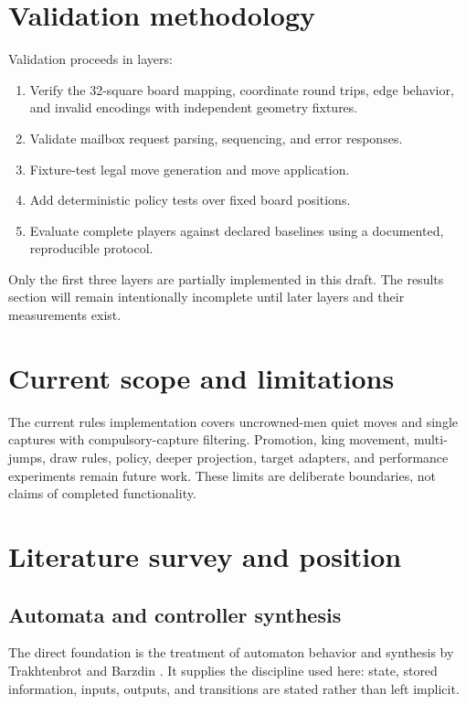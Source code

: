 \documentclass[11pt]{article}
\begin{document}
\section{Validation methodology}

Validation proceeds in layers:
\begin{enumerate}
  \item Verify the 32-square board mapping, coordinate round trips, edge
  behavior, and invalid encodings with independent geometry fixtures.
  \item Validate mailbox request parsing, sequencing, and error responses.
  \item Fixture-test legal move generation and move application.
  \item Add deterministic policy tests over fixed board positions.
  \item Evaluate complete players against declared baselines using a
  documented, reproducible protocol.
\end{enumerate}

Only the first three layers are partially implemented in this draft. The
results section will remain intentionally incomplete until later layers and
their measurements exist.

\section{Current scope and limitations}

The current rules implementation covers uncrowned-men quiet moves and
single captures with compulsory-capture filtering. Promotion, king movement,
multi-jumps, draw rules, policy, deeper projection, target adapters, and
performance experiments remain future work. These limits are deliberate
boundaries, not claims of completed functionality.

\section{Literature survey and position}

\subsection{Automata and controller synthesis}

The direct foundation is the treatment of automaton behavior and synthesis by
Trakhtenbrot and Barzdin \cite{trakhtenbrotBarzdin1973}. It supplies the
discipline used here: state, stored information, inputs, outputs, and
transitions are stated rather than left implicit.
\end{document}
